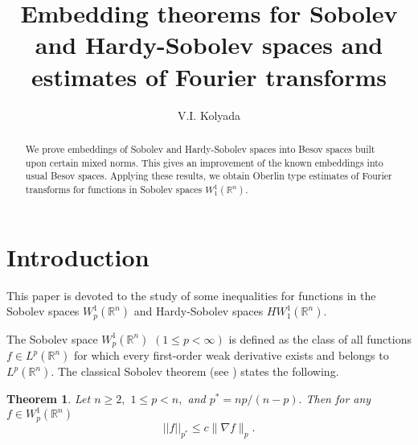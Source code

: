 \documentclass[12pt,twoside,reqno]{amsart}
\numberwithin{equation}{section}
\newtheorem{teo}{Theorem}[section]
\theoremstyle{definition}
\numberwithin{equation}{section}
\def\R{\mathbb{R}}
\begin{document}
\title[EMBEDDING THEOREMS]{Embedding theorems for   Sobolev and Hardy-Sobolev spaces and estimates of Fourier transforms}

\author[V.I. Kolyada]{V.I. Kolyada}
\address{Department of Mathematics\\
Karlstad University\\
Universitetsgatan 1 \\
651 88 Karlstad\\
SWEDEN} 









\begin{abstract}


We prove embeddings of Sobolev and Hardy-Sobolev spaces into Besov spaces built upon certain mixed norms.
This gives an improvement of the known embeddings into usual Besov spaces. Applying these results,
we obtain Oberlin type estimates of Fourier transforms for functions in Sobolev spaces $W_1^1(\R^n).$


\end{abstract}

\maketitle


\section{Introduction}

This paper is devoted to the study of some inequalities for functions in the Sobolev spaces $W_p^1(\R^n)$ and Hardy-Sobolev spaces $HW_1^1(\R^n)$.

The Sobolev space  $W_p^1(\R^n)$ $(1\le p<\infty)$ is defined as the class  of all functions $f\in L^p(\R^n)$ for which
every first-order  weak derivative exists and belongs to $L^p(\R^n).$
The  classical Sobolev theorem (see \cite[Ch. V]{St})  states the
following.
\begin{teo}\label{Sob1} Let $n\ge 2,$
$1\le p< n,$ and $p^*=np/(n-p).$ Then for any $f\in
W_p^1(\mathbb{R}^n)$
\begin{equation}\label{sob1}
||f||_{p^*}\le c \|\nabla f\|_p.
\end{equation}
\end{teo}
\end{document}
